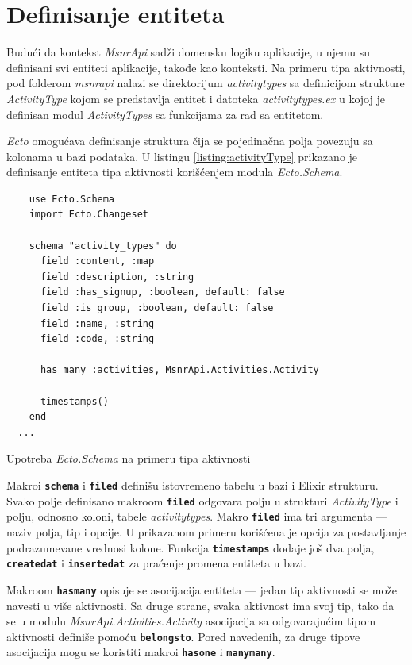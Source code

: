 \documentclass[12pt,oneside]{memoir}
\begin{document}
\section{Definisanje entiteta}
Budući da kontekst \emph{MsnrApi} sadži domensku logiku aplikacije, u njemu su definisani svi entiteti aplikacije, takođe
kao konteksti. Na primeru tipa aktivnosti, pod folderom \emph{msnr{\textunderscore}api} nalazi se direktorijum
\emph{activity{\textunderscore}types} sa definicijom strukture \emph{ActivityType} kojom se predstavlja
entitet i datoteka \emph{activity{\textunderscore}types.ex} u kojoj je definisan modul \emph{ActivityTypes} sa
funkcijama za rad sa entitetom.

\emph{Ecto} omogućava definisanje struktura čija se pojedinačna polja povezuju sa kolonama u bazi podataka. 
U listingu \ref{listing:activityType} prikazano je definisanje entiteta tipa aktivnosti korišćenjem modula
\emph{Ecto.Schema}.
\begin{listing}[!h]
  \begin{verbatim}
    use Ecto.Schema
    import Ecto.Changeset
  
    schema "activity_types" do
      field :content, :map
      field :description, :string
      field :has_signup, :boolean, default: false
      field :is_group, :boolean, default: false
      field :name, :string
      field :code, :string
  
      has_many :activities, MsnrApi.Activities.Activity
  
      timestamps()
    end
  ...
\end{verbatim}
\caption{Upotreba \emph{Ecto.Schema} na primeru tipa aktivnosti }
\label{listing:activityType}
\end{listing}
Makroi \texttt{\textbf{schema}} i \texttt{\textbf{filed}} definišu istovremeno tabelu u bazi i Elixir
strukturu. Svako polje definisano makroom \texttt{\textbf{filed}} odgovara polju u strukturi 
\emph{ActivityType} i polju, odnosno koloni, tabele \emph{activity{\textunderscore}types}.
Makro \texttt{\textbf{filed}} ima tri argumenta --- naziv polja, tip i opcije. U prikazanom primeru korišćena je
opcija za postavljanje podrazumevane vrednosi kolone. Funkcija \texttt{\textbf{timestamps}} dodaje još dva polja,
\texttt{\textbf{created{\textunderscore}at}} i \texttt{\textbf{inserted{\textunderscore}at}} za praćenje 
promena entiteta u bazi. 

Makroom \texttt{\textbf{has{\textunderscore}many}} opisuje se asocijacija 
entiteta --- jedan tip aktivnosti se može navesti u više aktivnosti. Sa druge strane, svaka aktivnost ima svoj tip,
tako da se u modulu \emph{MsnrApi.Activities.Activity} asocijacija sa odgovarajućim tipom aktivnosti definiše pomoću \texttt{\textbf{belongs{\textunderscore}to}}.
Pored navedenih, za druge tipove asocijacija
mogu se koristiti makroi \texttt{\textbf{has{\textunderscore}one}} i \texttt{\textbf{many{\textunderscore}many}}.
\end{document}
